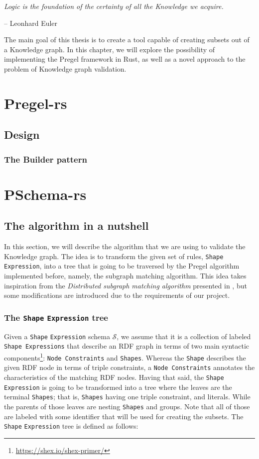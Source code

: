 \epigraph{\textit{Logic is the foundation of the certainty of all the Knowledge we acquire.}}{-- \textup{Leonhard Euler}}

The main goal of this thesis is to create a tool capable of creating subsets out of a Knowledge graph. In this chapter, we will explore the possibility of implementing the Pregel framework in Rust, as well as a novel approach to the problem of Knowledge graph validation.

\section{Pregel-rs}

\subsection{Design}

\subsubsection{The Builder pattern}

\section{PSchema-rs}

\subsection{The algorithm in a nutshell}

In this section, we will describe the algorithm that we are using to validate the Knowledge graph. The idea is to transform the given set of rules, \texttt{Shape} \texttt{Expression}, into a tree that is going to be traversed by the Pregel algorithm implemented before, namely, the subgraph matching algorithm. This idea takes inspiration from the \textit{Distributed subgraph matching algorithm} presented in \cite{Xu2019}, but some modifications are introduced due to the requirements of our project.

\subsubsection{The \texttt{Shape} \texttt{Expression} tree}

Given a \texttt{Shape} \texttt{Expression} schema $\mathcal{S}$, we assume that it is a collection of labeled \texttt{Shape Expressions} that describe an RDF graph in terms of two main syntactic components\footnote{\url{https://shex.io/shex-primer/}}: \texttt{Node Constraints} and \texttt{Shapes}. Whereas the \texttt{Shape} describes the given RDF node in terms of triple constraints, a \texttt{Node Constraints} annotates the characteristics of the matching RDF nodes. Having that said, the \texttt{Shape} \texttt{Expression} is going to be transformed into a tree where the leaves are the terminal \texttt{Shapes}; that is, \texttt{Shapes} having one triple constraint, and literals. While the parents of those leaves are nesting \texttt{Shapes} and groups. Note that all of those are labeled with some identifier that will be used for creating the subsets. The \texttt{Shape} \texttt{Expression} tree is defined as follows:

